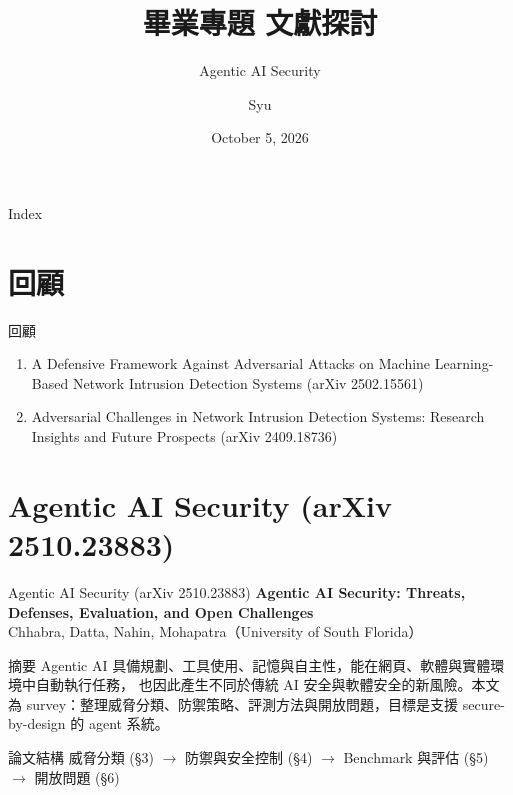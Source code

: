 \documentclass[aspectratio=169]{beamer}
\title[第二次雙周會]{畢業專題 文獻探討}
\subtitle{Agentic AI Security}
\author{Syu}
\date{October 5, 2026}
\begin{document}
\begin{frame}
    \titlepage
\end{frame}

\begin{frame}{Index}
    \tableofcontents
\end{frame}

\section{回顧}
\begin{frame}{回顧}
    \begin{enumerate}
        \item A Defensive Framework Against Adversarial Attacks on Machine Learning-Based Network Intrusion Detection Systems (arXiv 2502.15561)
        \item Adversarial Challenges in Network Intrusion Detection Systems: Research Insights and Future Prospects (arXiv 2409.18736)
    \end{enumerate}
\end{frame}


\section{Agentic AI Security (arXiv 2510.23883)}

\begin{frame}{Agentic AI Security (arXiv 2510.23883)}
    \small
    \textbf{Agentic AI Security: Threats, Defenses, Evaluation, and Open Challenges}\\
    Chhabra, Datta, Nahin, Mohapatra（University of South Florida）

    \medskip

    \begin{block}{摘要}
        Agentic AI 具備規劃、工具使用、記憶與自主性，能在網頁、軟體與實體環境中自動執行任務，
        也因此產生不同於傳統 AI 安全與軟體安全的新風險。本文為 survey：整理\alert{威脅分類}、\alert{防禦策略}、\alert{評測方法}與\alert{開放問題}，目標是支援 secure-by-design 的 agent 系統。
    \end{block}

    \begin{block}{論文結構}
        威脅分類 (§3) $\rightarrow$ 防禦與安全控制 (§4) $\rightarrow$ Benchmark 與評估 (§5) $\rightarrow$ 開放問題 (§6)
    \end{block}
\end{frame}
\end{document}
